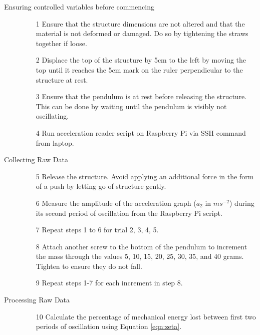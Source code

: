 \documentclass{article}
\begin{document}
\begin{description}
    \item [Ensuring controlled variables before commencing] \phantom{.}
    \begin{itemize}
        \item [1] Ensure that the structure dimensions are not altered and that the material is not deformed or damaged. Do so by tightening the straws together if loose.
        \item [2] Displace the top of the structure by 5cm to the left by moving the top until it reaches the 5cm mark on the ruler perpendicular to the structure at rest. 
        \item [3] Ensure that the pendulum is at rest before releasing the structure. This can be done by waiting until the pendulum is visibly not oscillating. 
        \item [4] Run acceleration reader script on Raspberry Pi via SSH command from laptop. 
    \end{itemize}
    \item [Collecting Raw Data] \phantom{.}
    \begin{itemize}
        \item [5] Release the structure. Avoid applying an additional force in the form of a push by letting go of structure gently. 
        \item [6] Measure the amplitude of the acceleration graph ($a_2$ in $ms^{-2}$) during its second period of oscillation from the Raspberry Pi script.
        \item [7] Repeat steps 1 to 6 for trial 2, 3, 4, 5. 
        \item [8] Attach another screw to the bottom of the pendulum to increment the mass through the values 5, 10, 15, 20, 25, 30, 35, and 40 grams. Tighten to ensure they do not fall.
        \item [9] Repeat steps 1-7 for each increment in step 8. 
    \end{itemize}
    \item [Processing Raw Data] \phantom{.}
    \begin{itemize}
        \item [10] Calculate the percentage of mechanical energy lost between first two periods of oscillation using Equation \ref{eqn:zeta}.
    \end{itemize}
\end{description}
\end{document}
